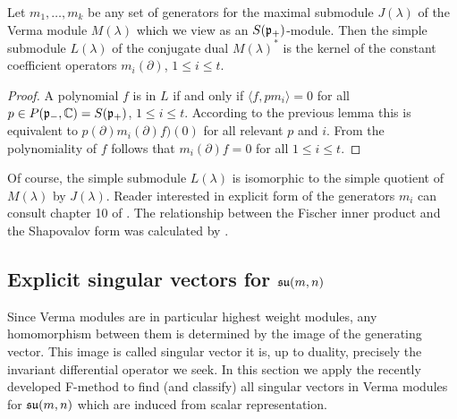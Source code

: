 \begin{theorem}
 Let $m_1,\ldots,m_k$ be any set of generators for the maximal submodule $J(\lambda)$ of the Verma module $M(\lambda)$ which we view as an $S(\mathfrak{p}_+)$-module. Then the simple submodule $L(\lambda)$ of the conjugate dual $M(\lambda)^*$ is the kernel of the constant coefficient operators $m_i(\partial)$, $1\leq i\leq t.$
\end{theorem}
\begin{proof}
 A polynomial $f$ is in $L$ if and only if $\langle f, p m_i \rangle = 0$ for all $p\in P(\mathfrak{p}_-,\mathbb{C}) = S(\mathfrak{p}_+)$, $1\leq i\leq t$. According to the previous lemma this is equivalent to $p(\partial)  m_i(\partial)f)(0)$ for all relevant $p$ and $i$. From the polynomiality of $f$ follows that $m_i(\partial)f = 0$ for all $1\leq i\leq t.$
\end{proof}

Of course, the simple submodule $L(\lambda)$ is isomorphic to the simple quotient of $M(\lambda)$ by $J(\lambda)$. Reader interested in explicit form of the generators $m_i$ can consult chapter 10 of \cite{davidson_differential_1991}. The relationship between the Fischer inner product and the Shapovalov form was calculated by \cite{wachi}.

\subsection[Explicit singular vectors for su(m, n)]{Explicit singular vectors for $\mathfrak{su}(m, n)$}\label{sec:invariant}

Since Verma modules are in particular highest weight modules, any homomorphism between them is determined by the image of the generating vector. This image is called singular vector it is, up to duality, precisely the invariant differential operator we seek. In this section we apply the recently developed F-method \cite{kobayashi_fmethod} to find (and classify) all singular vectors in Verma modules for $\mathfrak{su}(m, n)$ which are induced from scalar representation.

\medskip

